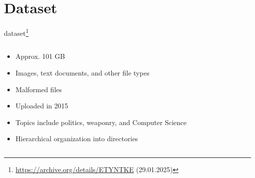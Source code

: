 \section{Dataset}

\begin{frame}{\ac{dataset}\footnote{\url{https://archive.org/details/ETYNTKE} (29.01.2025)}}
    \begin{columns}[T] %
        \begin{column}{0.6\textwidth}
             \begin{itemize}
                \item Approx. 101 GB 
                \item Images, text documents, and other file types
                \item Malformed files
                \item Uploaded in 2015
                \item Topics include politics, weaponry, and Computer Science
                \item Hierarchical organization into directories
            \end{itemize}
        \end{column}


\end{columns}
\end{frame}
